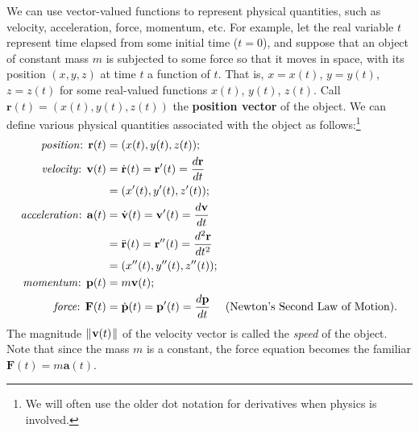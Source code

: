 We can use vector-valued functions to represent physical quantities, such as velocity, acceleration, force, momentum, etc. 
For example, let the real variable $t$ represent time elapsed from some initial time ($t = 0$), and suppose
that an object of constant mass $m$ is subjected to some force so that it moves in space, with its position $(x,y,z)$ at
time $t$ a function of $t$. That is, $x = x(t)$, $y = y(t)$, $z = z(t)$ for some real-valued functions $x(t)$, $y(t)$,
$z(t)$. Call $\mathbf{r}(t) = (x(t),y(t),z(t))$ the \textbf{position vector} of the object. We
can define various physical quantities associated with the object as follows:\footnote{We will often use the
older dot notation for derivatives when physics is involved.}
\begin{align*}
 \text{\emph{position}: } \mathbf{r}(t) &= (x(t),y(t),z(t));\\
 \text{\emph{velocity}: } \mathbf{v}(t) &= \dot{\mathbf{r}}(t) = \mathbf{r}'(t) = \dfrac{d \mathbf{r}}{dt}\\
 &= (x'(t),y'(t),z'(t));\\
 \text{\emph{acceleration}: } \mathbf{a}(t) &= \dot{\mathbf{v}}(t) = \mathbf{v}'(t) = \dfrac{d \mathbf{v}}{dt}\\
 &= \ddot{\mathbf{r}}(t) = \mathbf{r}''(t) = \dfrac{d^2 \mathbf{r}}{dt^2}\\
 &= (x''(t),y''(t),z''(t));\\
 \text{\emph{momentum}: } \mathbf{p}(t) &= m \mathbf{v}(t);\\
 \text{\emph{force}: } \mathbf{F}(t) &= \dot{\mathbf{p}}(t) = \mathbf{p}'(t) = \dfrac{d \mathbf{p}}{dt}
 \text{~~~~(Newton's Second Law of Motion).}
\end{align*}
The magnitude $\lVert\mspace{1mu}\mathbf{v}(t)\mspace{1mu}\rVert$ of the velocity vector is called the \emph{speed} of the object.
Note that since the mass $m$ is a constant, the force equation becomes the familiar
$\mathbf{F}(t) = m \mathbf{a}(t)$.


